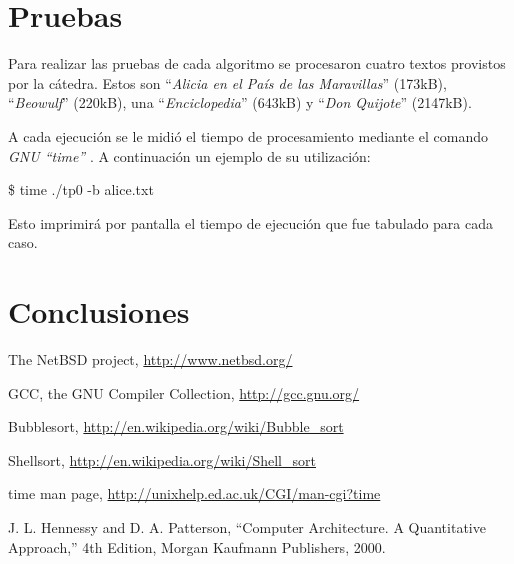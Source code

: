 \documentclass{article}
\begin{document}
\section{Pruebas}

	Para realizar las pruebas de cada algoritmo se procesaron cuatro textos provistos por la cátedra. Estos son ``\textit{Alicia en el País de las Maravillas}'' (173kB), ``\textit{Beowulf}'' (220kB), una ``\textit{Enciclopedia}'' (643kB) y ``\textit{Don Quijote}'' (2147kB).
	\par
	A cada ejecución se le midió el tiempo de procesamiento mediante el comando \textit{GNU ``time''} \cite{TIME}. A continuación un ejemplo de su utilización:
\bigskip

{\ttfamily\footnotesize
\indent \$ time ./tp0 -b alice.txt\\}


\noindent Esto imprimirá por pantalla el tiempo de ejecución que fue tabulado para cada caso. 
\bigskip




\section{Conclusiones}


\bigskip





\begin{thebibliography}{99}

	 The NetBSD project, \url{http://www.netbsd.org/}

	 GCC, the GNU Compiler Collection, \url{http://gcc.gnu.org/}

	 Bubblesort, \url{http://en.wikipedia.org/wiki/Bubble_sort}

	 Shellsort, \url{http://en.wikipedia.org/wiki/Shell_sort}

	 time man page, \url{http://unixhelp.ed.ac.uk/CGI/man-cgi?time}

	 J. L. Hennessy and D. A. Patterson, ``Computer Architecture. A Quantitative
	Approach,'' 4th Edition, Morgan Kaufmann Publishers, 2000.

	\end{thebibliography}



\newpage
\end{document}
